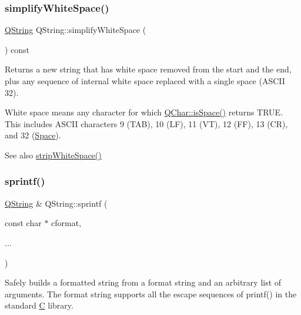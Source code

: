 \subsubsection{\texorpdfstring{simplifyWhiteSpace()}{simplifyWhiteSpace()}}
{\footnotesize\ttfamily \mbox{\hyperlink{class_q_string}{Q\+String}} Q\+String\+::simplify\+White\+Space (\begin{DoxyParamCaption}{ }\end{DoxyParamCaption}) const}

Returns a new string that has white space removed from the start and the end, plus any sequence of internal white space replaced with a single space (A\+S\+C\+II 32).

White space means any character for which \mbox{\hyperlink{class_q_char_a67814eae107b451db9def198ae57aa8a}{Q\+Char\+::is\+Space()}} returns T\+R\+UE. This includes A\+S\+C\+II characters 9 (T\+AB), 10 (LF), 11 (VT), 12 (FF), 13 (CR), and 32 (\mbox{\hyperlink{class_space}{Space}}).


\begin{DoxyCode}{0}
\end{DoxyCode}


\begin{DoxySeeAlso}{See also}
\mbox{\hyperlink{class_q_string_abc241c312bf04d7556ae830fc0f53d31}{strip\+White\+Space()}} 
\end{DoxySeeAlso}
\mbox{\label{class_q_string_a0b6622a8335cdd080e8b1685b7e0fde0}} 
\subsubsection{\texorpdfstring{sprintf()}{sprintf()}}
{\footnotesize\ttfamily \mbox{\hyperlink{class_q_string}{Q\+String}} \& Q\+String\+::sprintf (\begin{DoxyParamCaption}\item[{const char $\ast$}]{cformat,  }\item[{}]{... }\end{DoxyParamCaption})}

Safely builds a formatted string from a format string and an arbitrary list of arguments. The format string supports all the escape sequences of printf() in the standard \mbox{\hyperlink{class_c}{C}} library.

